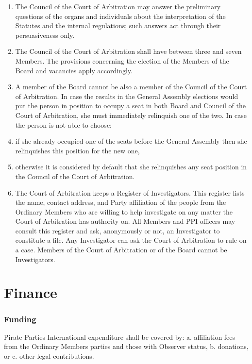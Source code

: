 \begin{frame}
\begin{enumerate}
\item The Council of the Court of Arbitration may answer the preliminary questions of the organs and individuals about the interpretation of the Statutes and the internal regulations; such answers act through their persuasiveness only.

\item The Council of the Court of Arbitration shall have between three and seven Members. The provisions concerning the election of the Members of the Board and vacancies apply accordingly.

\item A member of the Board cannot be also a member of the Council of the Court of Arbitration. In case the results in the General Assembly elections would put the person in position to occupy a seat in both Board and Council of the Court of Arbitration, she must immediately relinquish one of the two. In case the person is not able to choose:

\item if she already occupied one of the seats before the General Assembly then she relinquishes this position for the new one,

\item otherwise it is considered by default that she relinquishes any seat position in the Council of the Court of Arbitration.

\item The Court of Arbitration keeps a Register of Investigators. This register lists the name, contact address, and Party affiliation of the people from the Ordinary Members who are willing to help investigate on any matter the Court of Arbitration has authority on. All Members and PPI officers may consult this register and ask, anonymously or not, an Investigator to constitute a file. Any Investigator can ask the Court of Arbitration to rule on a case. Members of the Court of Arbitration or of the Board cannot be Investigators.

\end{enumerate}

\end{frame}

\section{Finance}
\label{finance}

\begin{frame}

\frametitle{Funding}
\label{funding}

Pirate Parties International expenditure shall be covered by:
a. affiliation fees from the Ordinary Members parties and those with Observer status,
b. donations, or
c. other legal contributions.

\end{frame}

